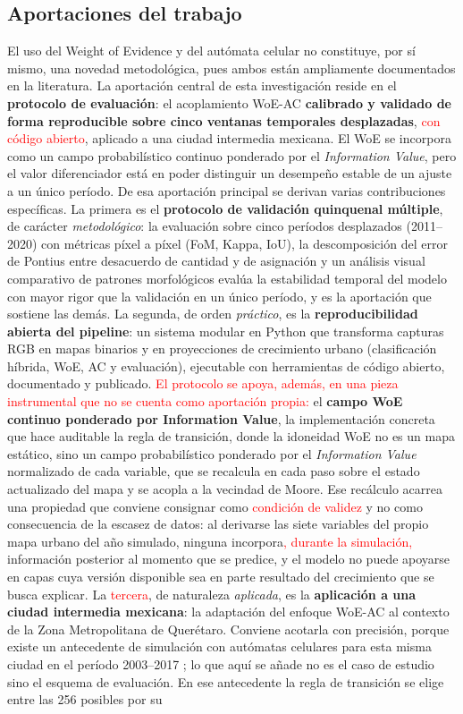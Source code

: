 \subsection{Aportaciones del trabajo}

El uso del Weight of Evidence y del autómata celular no constituye, por sí mismo, una novedad metodológica, pues ambos están ampliamente documentados en la literatura. La aportación central de esta investigación reside en el \textbf{protocolo de evaluación}: el acoplamiento WoE-AC \textbf{calibrado y validado de forma reproducible sobre cinco ventanas temporales desplazadas}, \textcolor{red}{con código abierto}, aplicado a una ciudad intermedia mexicana. El WoE se incorpora como un campo probabilístico continuo ponderado por el \textit{Information Value}, pero el valor diferenciador está en poder distinguir un desempeño estable de un ajuste a un único período. De esa aportación principal se derivan varias contribuciones específicas. La primera es el \textbf{protocolo de validación quinquenal múltiple}, de carácter \textit{metodológico}: la evaluación sobre cinco períodos desplazados (2011--2020) con métricas píxel a píxel (FoM, Kappa, IoU), la descomposición del error de Pontius entre desacuerdo de cantidad y de asignación y un análisis visual comparativo de patrones morfológicos evalúa la estabilidad temporal del modelo con mayor rigor que la validación en un único período, y es la aportación que sostiene las demás. La segunda, de orden \textit{práctico}, es la \textbf{reproducibilidad abierta del pipeline}: un sistema modular en Python que transforma capturas RGB en mapas binarios y en proyecciones de crecimiento urbano (clasificación híbrida, WoE, AC y evaluación), ejecutable con herramientas de código abierto, documentado y publicado. \textcolor{red}{El protocolo se apoya, además, en una pieza instrumental que no se cuenta como aportación propia:} el \textbf{campo WoE continuo ponderado por Information Value}, la implementación concreta que hace auditable la regla de transición, donde la idoneidad WoE no es un mapa estático, sino un campo probabilístico ponderado por el \textit{Information Value} normalizado de cada variable, que se recalcula en cada paso sobre el estado actualizado del mapa y se acopla a la vecindad de Moore. Ese recálculo acarrea una propiedad que conviene consignar como \textcolor{red}{condición de validez} y no como consecuencia de la escasez de datos: al derivarse las siete variables del propio mapa urbano del año simulado, ninguna incorpora\textcolor{red}{, durante la simulación,} información posterior al momento que se predice, y el modelo no puede apoyarse en capas cuya versión disponible sea en parte resultado del crecimiento que se busca explicar. La \textcolor{red}{tercera}, de naturaleza \textit{aplicada}, es la \textbf{aplicación a una ciudad intermedia mexicana}: la adaptación del enfoque WoE-AC al contexto de la Zona Metropolitana de Querétaro. Conviene acotarla con precisión, porque existe un antecedente de simulación con autómatas celulares para esta misma ciudad en el período 2003--2017 \parencite{JimenezLopez2018}; lo que aquí se añade no es el caso de estudio sino el esquema de evaluación. En ese antecedente la regla de transición se elige entre las 256 posibles por su 